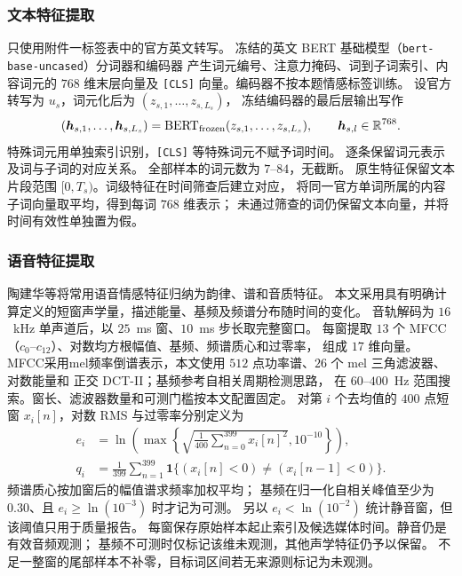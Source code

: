 \documentclass[bwprint]{gmcmthesis}
\begin{document}
\subsubsection{文本特征提取}
只使用附件一标签表中的官方英文转写。
冻结的英文 BERT 基础模型（\texttt{bert-base-\allowbreak uncased}）分词器和编码器\citep{bert_acl_online}
产生词元编号、注意力掩码、词到子词索引、内容词元的 $768$ 维末层向量及
\texttt{[CLS]} 向量。编码器不按本题情感标签训练。
设官方转写为 $u_s$，词元化后为 $(z_{s,1},\ldots,z_{s,L_s})$，
冻结编码器的最后层输出写作
\begin{equation}
 (\boldsymbol h_{s,1},\ldots,\boldsymbol h_{s,L_s})
 =\operatorname{BERT}_{\rm frozen}(z_{s,1},\ldots,z_{s,L_s}),
 \qquad \boldsymbol h_{s,l}\in\mathbb R^{768}.
 \label{eq:p1-text}
\end{equation}
特殊词元用单独索引识别，\texttt{[CLS]} 等特殊词元不赋予词时间。
逐条保留词元表示及词与子词的对应关系。
全部样本的词元数为 $7$--$84$，无截断。
原生特征保留文本片段范围 $[0,T_s)$。词级特征在时间筛查后建立对应，
将同一官方单词所属的内容子词向量取平均，得到每词 $768$ 维表示；
未通过筛查的词仍保留文本向量，并将时间有效性单独置为假。

\subsubsection{语音特征提取}
陶建华等\citep{tao2023speech}将常用语音情感特征归纳为韵律、谱和音质特征。
本文采用具有明确计算定义的短窗声学量，描述能量、基频及频谱分布随时间的变化。
音轨解码为 $16$~kHz 单声道后，以 $25$~ms 窗、$10$~ms 步长取完整窗口。
每窗提取 $13$ 个 MFCC（$c_0$--$c_{12}$）、对数均方根幅值、基频、频谱质心和过零率，
组成 $17$ 维向量。MFCC采用mel频率倒谱表示\citep{davis1980mfcc}，本文使用 $512$ 点功率谱、$26$ 个 mel 三角滤波器、对数能量和
正交 DCT-II；基频参考自相关周期检测思路\citep{rabiner1977pitch}，
在 $60$--$400$~Hz 范围搜索。窗长、滤波器数量和可测门槛按本文配置固定。
对第 $i$ 个去均值的 $400$ 点短窗 $x_i[n]$，对数 RMS 与过零率分别定义为
\begin{equation}
 \begin{aligned}
 e_i&=\ln\!\left(\max\!\left\{
 \sqrt{\frac{1}{400}\sum_{n=0}^{399}x_i[n]^2},10^{-10}
 \right\}\right),\\
 q_i&=\frac{1}{399}\sum_{n=1}^{399}
 \mathbf 1\{(x_i[n]<0)\ne(x_i[n-1]<0)\}.
 \end{aligned}
 \label{eq:p1-energy-zcr}
\end{equation}
频谱质心按加窗后的幅值谱求频率加权平均；
基频在归一化自相关峰值至少为 $0.30$、且
$e_i\geq\ln(10^{-3})$ 时才记为可测。
另以 $e_i<\ln(10^{-2})$ 统计静音窗，但该阈值只用于质量报告。
每窗保存原始样本起止索引及候选媒体时间。静音仍是有效音频观测；
基频不可测时仅标记该维未观测，其他声学特征仍予以保留。
不足一整窗的尾部样本不补零，目标词区间若无来源则标记为未观测。
\end{document}
